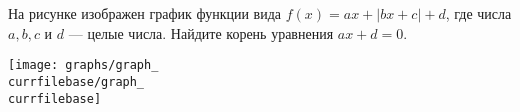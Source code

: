 \begin{ex}
	\begin{condition}
		\begin{minipage}[t]{0.67\textwidth}
			На рисунке изображен график функции вида \( f(x)=ax+|bx+c|+d \), где числа \( a, b, c \) и \( d \) --- целые числа. Найдите корень уравнения \( ax+d=0 \).
		\end{minipage}
		\begin{minipage}[c]{0.25\textwidth}
			\texttt{[image: graphs/graph\_\\currfilebase/graph\_\\currfilebase]}
		\end{minipage}
	\end{condition}
\end{ex}